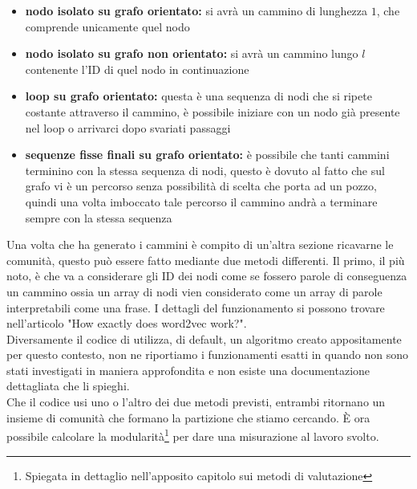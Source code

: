 \begin{itemize}
	\item \textbf{nodo isolato su grafo orientato:} si avrà un cammino di lunghezza $1$, che comprende unicamente quel nodo
	\item \textbf{nodo isolato su grafo non orientato:} si avrà un cammino lungo $l$ contenente l'ID di quel nodo in continuazione
	\item \textbf{loop su grafo orientato:} questa è una sequenza di nodi che si ripete costante attraverso il cammino, è possibile iniziare con un nodo già presente nel loop o arrivarci dopo svariati passaggi
	\item \textbf{sequenze fisse finali su grafo orientato:} è possibile che tanti cammini terminino con la stessa sequenza di nodi, questo è dovuto al fatto che sul grafo vi è un percorso senza possibilità di scelta che porta ad un pozzo, quindi una volta imboccato tale percorso il cammino andrà a terminare sempre con la stessa sequenza
\end{itemize}
%
Una volta che \nv ha generato i cammini è compito di un'altra sezione ricavarne le comunità, questo può essere fatto mediante due metodi differenti. Il primo, il più noto, è \wv che va a considerare gli ID dei nodi come se fossero parole di conseguenza un cammino ossia un array di nodi vien considerato come un array di parole interpretabili come una frase. I dettagli del funzionamento si possono trovare nell'articolo "How exactly does word2vec work?".\\
Diversamente il codice di \cnrl utilizza, di default, un algoritmo creato appositamente per questo contesto, non ne riportiamo i funzionamenti esatti in quando non sono stati investigati in maniera approfondita e non esiste una documentazione dettagliata che li spieghi.\\
Che il codice usi uno o l'altro dei due metodi previsti, entrambi ritornano un insieme di comunità che formano la partizione che stiamo cercando. È ora possibile calcolare la modularità\footnote{Spiegata in dettaglio nell'apposito capitolo sui metodi di valutazione} per dare una misurazione al lavoro svolto.
%
